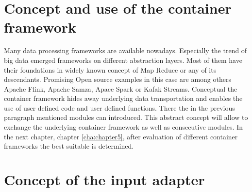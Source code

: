 \section{Concept and use of the container framework \label{sec:containerframework}}

Many data processing frameworks are available nowadays. Especially the trend of big data emerged frameworks on different abstraction layers. Most of them have their foundations in widely known concept of Map Reduce or any of its descendants. Promising Open source examples in this case are among others Apache Flink, Apache Samza, Apace Spark or Kafak Streams. Conceptual the container framework hides away underlying data transportation and enables the use of user defined code and user defined functions. There the in the previous paragraph mentioned modules can introduced. This abstract concept will allow to exchange the underlying container framework as well as consecutive modules. In the next chapter, chapter \ref{cha:chapter5}, after evaluation of different container frameworks the best suitable is determined.

\section{Concept of the input adapter \label{sec:inputadapter}}

